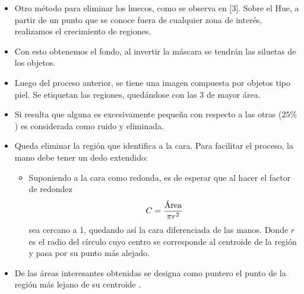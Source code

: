 \documentclass[portrait,a0paper,fontscale=0.277]{baposter}
\newcommand{\compresslist}{%
\setlength{\topsep}{0pt}%
\setlength{\itemsep}{0pt}%
\setlength{\parskip}{0pt}%
\setlength{\parsep}{0pt}%
}
\begin{document}
\begin{poster}
{\begin{description}
			\begin{itemize}\compresslist	
			 \item Otro método  para  eliminar  los  huecos, como se observa en [3].
					Sobre el Hue, a partir de  un  punto  que  se conoce fuera de cualquier zona de  interés,  realizamos  el  crecimiento  de
					regiones. 
\item Con esto obtenemos el fondo, al invertir  la  máscara  se tendrán
					las siluetas de los objetos.
			\end{itemize}	
		\item[Eliminación de la cara] \hfill
			\begin{itemize}\compresslist	
			\item Luego del proceso anterior, se tiene una imagen compuesta por  objetos  tipo
			piel. Se etiquetan las  regiones, quedándose con las 3  de  mayor
			área.
			\item Si resulta que  alguna  es  excesivamente
			pequeña con respecto a  las  otras  ($25 \%$)  es  considerada  como  ruido  y
			eliminada.

			\item Queda  eliminar la región que identifica a la cara. Para facilitar el proceso, la mano debe
			tener un dedo extendido: 
			\begin{itemize}\compresslist
			\item Suponiendo a la cara como redonda, es de esperar
			que al hacer el factor de  redondez
			\[ C = \frac{\makebox{Área}}{\pi r^2}\]
			sea cercano a 1, quedando así la cara diferenciada de las manos. Donde $r$  es
			el radio del círculo cuyo centro se corresponde al centroide de la región  y
			pasa por su punto más alejado.%
			\end{itemize}
			\end{itemize}
		\item[Ubicación del puntero] \hfill
		\begin{itemize}\compresslist
		\item De las áreas interesantes obtenidas se designa como puntero el punto de la región  más lejano de su centroide .
		\end{itemize}
	
	\end{description}
	}


\end{poster}
\end{document}

